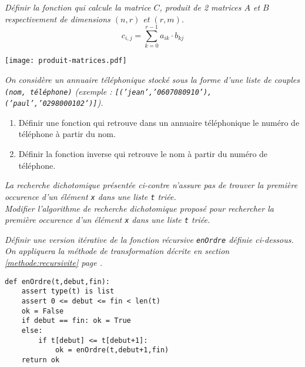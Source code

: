 \begin{td}\label{td:matrices1}
\em
Définir la fonction qui calcule la matrice $C$, produit 
de 2 matrices $A$ et $B$ respectivement de dimensions $(n,r)$ et $(r,m)$.
$$c_{i,j} = \sum_{k=0}^{r-1}a_{ik}\cdot b_{kj}$$
\centerline{\texttt{[image: produit-matrices.pdf]}}
\end{td}

\begin{td}\label{td:annuaire}
\em
On considère un annuaire téléphonique stocké sous la forme d'une liste de couples
{\tt (nom, téléphone)} (exemple : {\tt [('jean','0607080910'),('paul','0298000102')]}).
\begin{enumerate}
\item Définir une fonction qui retrouve dans un annuaire téléphonique
	le numéro de téléphone à partir du nom.
\item Définir la fonction inverse qui retrouve 
	le nom à partir du numéro de téléphone.
\end{enumerate}
\end{td}

\begin{td}\label{td:dicho}
\em
La recherche dichotomique présentée ci-contre n'assure pas de trouver la première occurence
d'un élément {\tt x} dans une liste {\tt t} triée.\\
Modifier l'algorithme de recherche dichotomique proposé pour rechercher la
première occurence d'un élément {\tt x} dans une liste {\tt t} triée.
\end{td}

\begin{td}\label{td:enordre}
\em
Définir une version itérative de la fonction récursive {\tt enOrdre}
définie ci-dessous. On appliquera la méthode de transformation décrite en
section \ref{methode:recursivite} page \pageref{methode:recursivite}.

\footnotesize
\begin{verbatim}
def enOrdre(t,debut,fin):
    assert type(t) is list
    assert 0 <= debut <= fin < len(t)
    ok = False
    if debut == fin: ok = True
    else:
        if t[debut] <= t[debut+1]: 
            ok = enOrdre(t,debut+1,fin)
    return ok
\end{verbatim}

\end{td}

